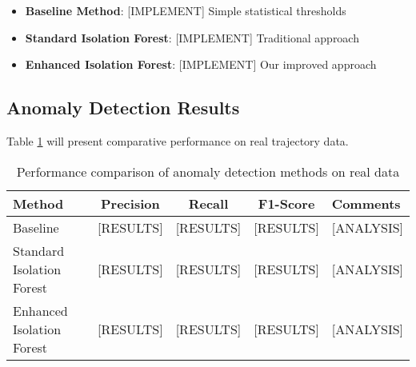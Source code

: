 \documentclass[runningheads]{llncs}
\begin{document}
\begin{itemize}
\item \textbf{Baseline Method}: [IMPLEMENT] Simple statistical thresholds

\item \textbf{Standard Isolation Forest}: [IMPLEMENT] Traditional approach

\item \textbf{Enhanced Isolation Forest}: [IMPLEMENT] Our improved approach
\end{itemize}


\subsection{Anomaly Detection Results}
\label{sec:results}


Table \ref{tab:evaluation-results} will present comparative performance on real trajectory data.

\begin{table}[h]
\centering
\begin{tabular}{l|c|c|c|l}
\textbf{Method} & \textbf{Precision} & \textbf{Recall} & \textbf{F1-Score} & \textbf{Comments} \\ \hline
Baseline & [RESULTS] & [RESULTS] & [RESULTS] & [ANALYSIS] \\
Standard Isolation Forest & [RESULTS] & [RESULTS] & [RESULTS] & [ANALYSIS] \\
Enhanced Isolation Forest & [RESULTS] & [RESULTS] & [RESULTS] & [ANALYSIS] \\
\end{tabular}
\caption{Performance comparison of anomaly detection methods on real data}
\label{tab:evaluation-results}
\end{table}

\end{document}
